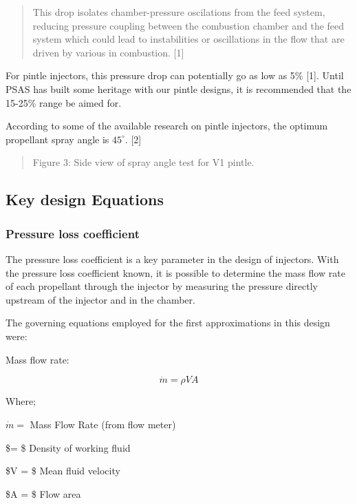 \documentclass[11pt]{article}
\begin{document}
\begin{quote}
This drop isolates chamber-pressure oscilations from the feed system,
reducing pressure coupling between the combustion chamber and the feed
system which could lead to instabilities or oscillations in the flow
that are driven by various in combustion. {[}1{]}
\end{quote}

For pintle injectors, this pressure drop can potentially go as low as
5\% {[}1{]}. Until PSAS has built some heritage with our pintle designs,
it is recommended that the 15-25\% range be aimed for.

According to some of the available research on pintle injectors, the
optimum propellant spray angle is \(45^\circ\). {[}2{]}

\begin{quote}
Figure 3: Side view of spray angle test for V1 pintle.
\end{quote}

\subsection{Key design Equations}\label{key-design-equations}

\subsubsection{Pressure loss
coefficient}\label{pressure-loss-coefficient}

The pressure loss coefficient is a key parameter in the design of
injectors. With the pressure loss coefficient known, it is possible to
determine the mass flow rate of each propellant through the injector by
measuring the pressure directly upstream of the injector and in the
chamber.

The governing equations employed for the first approximations in this
design were:

Mass flow rate:

\begin{equation}
 \dot{m} = \rho VA
\label{eq:massflow}
\tag{1}
\end{equation}

Where;

\(\dot{m} =\) Mass Flow Rate (from flow meter)

\$\rho = \$ Density of working fluid

\$V = \$ Mean fluid velocity

\$A = \$ Flow area
\end{document}
